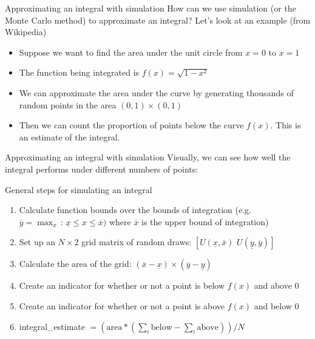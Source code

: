 \documentclass[english,xcolor=dvipsnames]{beamer}
\begin{document}
\begin{frame}{Approximating an integral with simulation}
How can we use simulation (or the Monte Carlo method) to approximate an integral? Let's look at an example (from Wikipedia)
\begin{itemize}
	\item Suppose we want to find the area under the unit circle from $x=0$ to $x=1$
	\item The function being integrated is $f\left(x\right)=\sqrt{1-x^{2}}$
	\item We can approximate the area under the curve by generating thousands of random points in the area $(0,1)\times(0,1)$
	\item Then we can count the proportion of points below the curve $f\left(x\right)$. This is an estimate of the integral.
\end{itemize}
\end{frame}

\begin{frame}{Approximating an integral with simulation}
Visually, we can see how well the integral performs under different numbers of points:
\begin{center}
\end{center}
\end{frame}

\begin{frame}{General steps for simulating an integral}
\begin{enumerate}
	\item Calculate function bounds over the bounds of integration (e.g. $\overline{y}=\max_{x}\,:\,\underline{x}\leq x\leq\overline{x})$ where $\overline{x}$ is the upper bound of integration)
	\item Set up an $N\times 2$ grid matrix of random draws: $\left[U(\underline{x},\overline{x})\,\,U(\underline{y},\overline{y})\right]$
	\item Calculate the area of the grid: $\left(\overline{x}-\underline{x}\right)\times\left(\overline{y}-\underline{y}\right)$
	\item Create an indicator for whether or not a point is below $f\left(x\right)$ and above $0$
	\item Create an indicator for whether or not a point is above $f\left(x\right)$ and below $0$
	\item integral\_estimate $= \left(\textrm{area}*\left(\sum_{i}\textrm{below}-\sum_{i}\textrm{above}\right)\right)/N$
\end{enumerate}
\end{frame}
\end{document}
